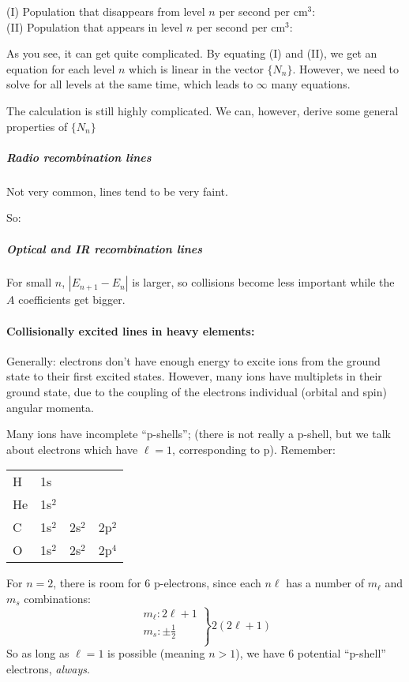 \documentclass[11pt]{article}
\newcommand{\mar}[1]{\hspace{0pt}\marginpar{-\textcolor{black}{#1}-}}
\begin{document}
(I) Population that disappears from level $n$ per second per cm$^{3}$:
\[
    \]
(II) Population that appears in level $n$ per second per cm$^{3}$:
\[
    \]

As you see, it can get quite complicated. By equating (I) and (II), we
get an equation for each level $n$ which is linear in the vector
$\{ N_{n} \}$. However, we need to solve for all levels at the same time,
which leads to $\infty$ many equations.


\mar{71}The calculation is still highly complicated. We can, however,
derive some general properties of $\{N_{n}\}$

\subparagraph{Radio recombination lines}
Not very common, lines tend to be very faint.

\mar{72}So:
\[
    \]

\subparagraph{Optical and IR recombination lines}
For small $n$, $|E_{n+1} - E_{n}|$ is larger, so collisions become
less important while the $A$ coefficients get bigger.


\paragraph{Collisionally excited lines in heavy elements:}
\mar{79}Generally: electrons don't have enough energy to excite ions from
the ground state to their first excited states. However, many
ions have multiplets in their ground state, due to the coupling of
the electrons individual (orbital and spin) angular momenta.

Many ions have incomplete ``p-shells''; (there is not really a p-shell,
but we talk about electrons which have $\ell = 1$, corresponding to p).
Remember:

\begin{tabular}{l l l l}
    H & 1s\\
    He & 1s$^{2}$\\
    C & 1s$^{2}$ & 2s$^{2}$ & 2p$^{2}$\\
    O & 1s$^{2}$ & 2s$^{2}$ & 2p$^{4}$
\end{tabular}
For $n=2$, there is room for 6 p-electrons, since each $n\ell$ has
a number of $m_{\ell}$ and $m_{s}$ combinations:
\begin{equation*}
    \left.
        \begin{array}{l}
            m_{\ell}: 2\ell+1\\
            m_{s}: \pm \frac{1}{2}\\
        \end{array}
    \right\} 2(2\ell+1)
\end{equation*}
So as long as $\ell=1$ is possible (meaning $n>1$), we have 6 potential
``p-shell'' electrons, \emph{always}.
\end{document}
